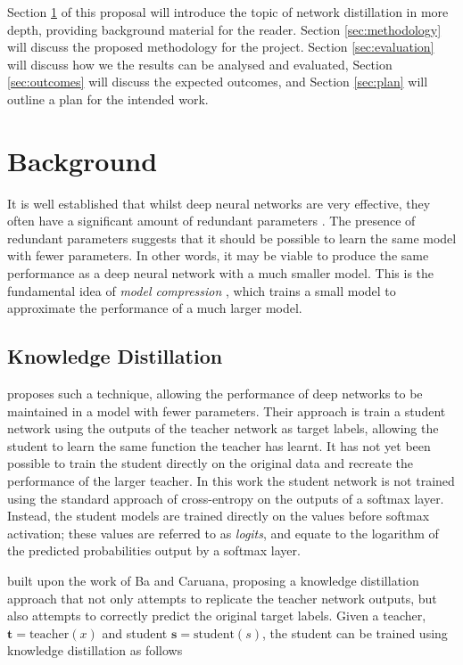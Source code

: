 \documentclass[a4paper,11pt]{article}
\begin{document}

Section \ref{sec:background} of this proposal will introduce the topic of network distillation in more depth, providing background material for the reader. Section \ref{sec:methodology} will discuss the proposed methodology for the project. Section \ref{sec:evaluation} will discuss how we the results can be analysed and evaluated, Section \ref{sec:outcomes} will discuss the expected outcomes, and Section \ref{sec:plan} will outline a plan for the intended work.

\section{Background}
\label{sec:background}
It is well established that whilst deep neural networks are very effective, they often have a significant amount of redundant parameters \cite{denil2013predicting}. The presence of redundant parameters suggests that it should be possible to learn the same model with fewer parameters. In other words, it may be viable to produce the same performance as a deep neural network with a much smaller model. This is the fundamental idea of \textit{model compression} \cite{bucilua2006model}, which trains a small model to approximate the performance of a much larger model. 

\subsection{Knowledge Distillation}
\cite{ba2014deep} proposes such a technique, allowing the performance of deep networks to be maintained in a model with fewer parameters. Their approach is train a student network using the outputs of the teacher network as target labels, allowing the student to learn the same function the teacher has learnt. It has not yet been possible to train the student directly on the original data and recreate the performance of the larger teacher. In this work the student network is not trained using the standard approach of cross-entropy on the outputs of a softmax layer. Instead, the student models are trained directly on the values before softmax activation; these values are referred to as \textit{logits}, and equate to the logarithm of the predicted probabilities output by a softmax layer. 

\cite{hinton2015distilling} built upon the work of Ba and Caruana, proposing a knowledge distillation approach that not only attempts to replicate the teacher network outputs, but also attempts to correctly predict the original target labels. Given a teacher, $\mathbf{t} = \textrm{teacher}(x)$ and student $\mathbf{s} = \textrm{student}(s)$, the student can be trained using knowledge distillation as follows
\end{document}
